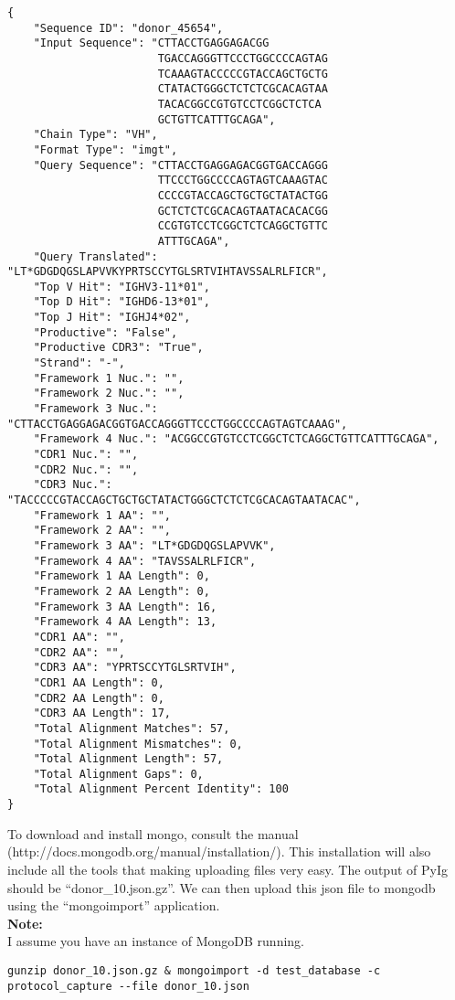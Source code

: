 \begin{lstlisting}[breaklines=true]
{
    "Sequence ID": "donor_45654",
    "Input Sequence": "CTTACCTGAGGAGACGG
                       TGACCAGGGTTCCCTGGCCCCAGTAG
                       TCAAAGTACCCCCGTACCAGCTGCTG
                       CTATACTGGGCTCTCTCGCACAGTAA
                       TACACGGCCGTGTCCTCGGCTCTCA
                       GCTGTTCATTTGCAGA",
    "Chain Type": "VH",
    "Format Type": "imgt",
    "Query Sequence": "CTTACCTGAGGAGACGGTGACCAGGG
                       TTCCCTGGCCCCAGTAGTCAAAGTAC
                       CCCCGTACCAGCTGCTGCTATACTGG
                       GCTCTCTCGCACAGTAATACACACGG
                       CCGTGTCCTCGGCTCTCAGGCTGTTC
                       ATTTGCAGA",
    "Query Translated": "LT*GDGDQGSLAPVVKYPRTSCCYTGLSRTVIHTAVSSALRLFICR",
    "Top V Hit": "IGHV3-11*01",
    "Top D Hit": "IGHD6-13*01",
    "Top J Hit": "IGHJ4*02",
    "Productive": "False",
    "Productive CDR3": "True",
    "Strand": "-",
    "Framework 1 Nuc.": "",
    "Framework 2 Nuc.": "",
    "Framework 3 Nuc.": "CTTACCTGAGGAGACGGTGACCAGGGTTCCCTGGCCCCAGTAGTCAAAG",
    "Framework 4 Nuc.": "ACGGCCGTGTCCTCGGCTCTCAGGCTGTTCATTTGCAGA",
    "CDR1 Nuc.": "",
    "CDR2 Nuc.": "",
    "CDR3 Nuc.": "TACCCCCGTACCAGCTGCTGCTATACTGGGCTCTCTCGCACAGTAATACAC",
    "Framework 1 AA": "",
    "Framework 2 AA": "",
    "Framework 3 AA": "LT*GDGDQGSLAPVVK",
    "Framework 4 AA": "TAVSSALRLFICR",
    "Framework 1 AA Length": 0,
    "Framework 2 AA Length": 0,
    "Framework 3 AA Length": 16,
    "Framework 4 AA Length": 13,
    "CDR1 AA": "",
    "CDR2 AA": "",
    "CDR3 AA": "YPRTSCCYTGLSRTVIH",
    "CDR1 AA Length": 0,
    "CDR2 AA Length": 0,
    "CDR3 AA Length": 17,
    "Total Alignment Matches": 57,
    "Total Alignment Mismatches": 0,
    "Total Alignment Length": 57,
    "Total Alignment Gaps": 0,
    "Total Alignment Percent Identity": 100
}
\end{lstlisting}

To download and install mongo, consult the manual \\ (http://docs.mongodb.org/manual/installation/). This installation will also include all the tools that making uploading files very easy. The output of PyIg should be ``donor\_10.json.gz''. We can then upload this json file to mongodb using the ``mongoimport'' application. \\

\textbf{Note:} \\
I assume you have an instance of MongoDB running.

\begin{lstlisting}[breaklines=true]
gunzip donor_10.json.gz & mongoimport -d test_database -c protocol_capture --file donor_10.json
\end{lstlisting}

